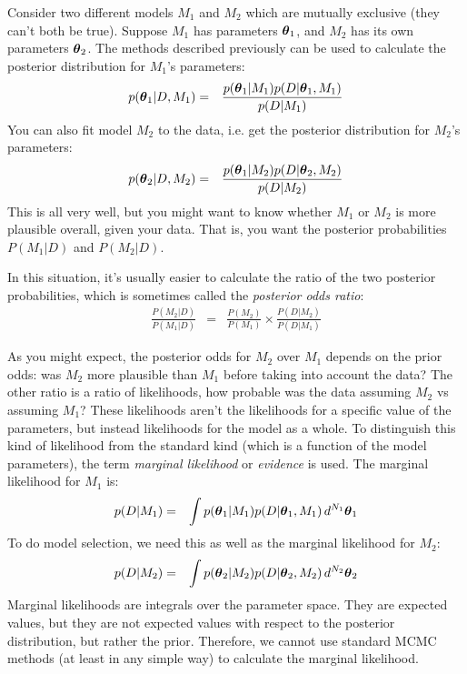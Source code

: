 Consider two different models $M_1$ and $M_2$ which are mutually exclusive
(they can't both be true).
Suppose $M_1$ has parameters
$\boldsymbol{\theta}_1$, and $M_2$ has its own parameters $\boldsymbol{\theta}_2$. The methods
described previously can be used to calculate the posterior distribution for
$M_1$'s parameters:
\begin{eqnarray}
p(\boldsymbol{\theta}_1 | D, M_1) &=& \frac{p(\boldsymbol{\theta}_1 | M_1)p(D | \boldsymbol{\theta}_1, M_1)}
{p(D | M_1)}
\end{eqnarray}
You can also fit model $M_2$ to the data, i.e. get the posterior distribution
for $M_2$'s parameters:
\begin{eqnarray}
p(\boldsymbol{\theta}_2 | D, M_2) &=& \frac{p(\boldsymbol{\theta}_1 | M_2)p(D | \boldsymbol{\theta}_2, M_2)}
{p(D | M_2)}
\end{eqnarray}
This is all very well, but you might want to know whether $M_1$ or $M_2$ is
more plausible overall, given your data. That is, you want the posterior
probabilities $P(M_1 | D)$ and $P(M_2 | D)$.

In this situation, it's usually easier to calculate the ratio of the two
posterior probabilities, which is sometimes called the {\it posterior odds
ratio}:
\begin{eqnarray}
\frac{P(M_2 | D)}{P(M_1 | D)} &=& \frac{P(M_2)}{P(M_1)}
\times \frac{P(D | M_2)}{P(D | M_1)}
\end{eqnarray}

As you might expect, the posterior odds for $M_2$ over $M_1$ depends on the
prior odds: was $M_2$ more plausible than $M_1$ before taking into account the
data? The other ratio is a ratio of likelihoods, how probable was the data
assuming $M_2$ vs assuming $M_1$? These likelihoods aren't the likelihoods
for a specific value of the parameters, but instead likelihoods for the model
as a whole. To distinguish this kind of likelihood from the standard kind (which
is a function of the model parameters), the term {\it marginal likelihood} or
{\it evidence} is used. The marginal likelihood for $M_1$ is:
\begin{eqnarray}
p(D | M_1) &=& \int p(\boldsymbol{\theta}_1 | M_1) p(D | \boldsymbol{\theta}_1, M_1) \, d^{N_1} \boldsymbol{\theta}_1
\label{eq:marginal_likelihood}
\end{eqnarray}
To do model selection, we need this as well as the marginal likelihood for
$M_2$:
\begin{eqnarray}
p(D | M_2) &=& \int p(\boldsymbol{\theta}_2 | M_2) p(D | \boldsymbol{\theta}_2, M_2) \, d^{N_2} \boldsymbol{\theta}_2
\end{eqnarray}
Marginal likelihoods are integrals over the parameter space. They are
expected values, but they are not expected values with respect to the posterior
distribution, but rather the prior. Therefore, we cannot use standard MCMC
methods (at least in any simple way) to calculate the marginal likelihood.

